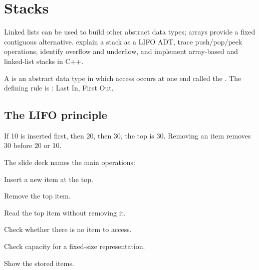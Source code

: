 \chapter{Stacks}\label{ch:stacks}

\chapterguide%
  {Linked lists can be used to build other abstract data types; arrays provide a fixed contiguous alternative.}
  {explain a stack as a LIFO ADT, trace push/pop/peek operations, identify overflow and underflow, and implement array-based and linked-list stacks in C++.}

A  is an abstract data type in which access occurs at one end called the . The defining rule is : Last In, First Out.

\section{The LIFO principle}

If 10 is inserted first, then 20, then 30, the top is 30. Removing an item removes 30 before 20 or 10.

\begin{mlfigure}
\end{mlfigure}

The slide deck names the main operations:

\begin{description}[leftmargin=1.2in,style=nextline]
  \item[push()] Insert a new item at the top.
  \item[pop()] Remove the top item.
  \item[peek()] Read the top item without removing it.
  \item[isEmpty()] Check whether there is no item to access.
  \item[isFull()] Check capacity for a fixed-size representation.
  \item[display()] Show the stored items.
\end{description}

